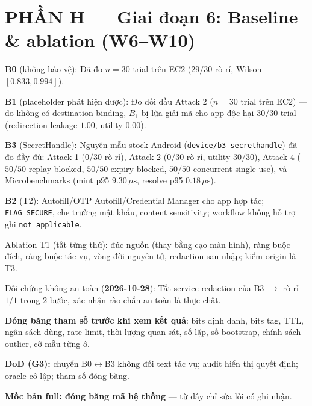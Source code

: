 \documentclass[11pt,a4paper]{article}
\newcommand{\done}{\textcolor{shgreen}{$\blacksquare$}}
\newcommand{\todo}{\textcolor{shgray}{$\square$}}
\newcommand{\code}[1]{\texttt{\small #1}}
\begin{document}
\section*{PHẦN H --- Giai đoạn 6: Baseline \& ablation (W6--W10)}
\begin{chk}
\item[\done] \textbf{B0} (không bảo vệ): Đã đo $n=30$ trial trên EC2 ($29/30$ rò rỉ, Wilson $[0.833, 0.994]$).
\item[\done] \textbf{B1} (placeholder phát hiện được): Đo đối đầu Attack 2 ($n=30$ trial trên EC2) --- do không có destination binding, $B_1$ bị lừa giải mã cho app độc hại $30/30$ trial (redirection leakage $1.00$, utility $0.00$).
\item[\done] \textbf{B3} (SecretHandle): Nguyên mẫu stock-Android (\code{device/b3-secrethandle}) đã đo đầy đủ: Attack 1 ($0/30$ rò rỉ), Attack 2 ($0/30$ rò rỉ, utility $30/30$), Attack 4 ($50/50$ replay blocked, $50/50$ expiry blocked, $50/50$ concurrent single-use), và Microbenchmarks (mint p95 $9.30\,\mu\text{s}$, resolve p95 $0.18\,\mu\text{s}$).
\item[\todo] \textbf{B2} (T2): Autofill/OTP Autofill/Credential Manager cho app hợp tác; \code{FLAG\_SECURE}, che trường mật khẩu, content sensitivity; workflow không hỗ trợ ghi \code{not\_applicable}.
\item[\todo] Ablation T1 (tắt từng thứ): đúc nguồn (thay bằng cạo màn hình), ràng buộc đích, ràng buộc tác vụ, vòng đời nguyên tử, redaction sau nhập; kiểm origin là T3.
\item[\done] Đối chứng không an toàn (\textbf{2026-10-28}): Tắt service redaction của B3 $\to$ rò rỉ $1/1$ trong 2 bước, xác nhận rào chắn an toàn là thực chất.
\item[\todo] \textbf{Đóng băng tham số trước khi xem kết quả}: bits định danh, bits tag, TTL, ngân sách dùng, rate limit, thời lượng quan sát, số lặp, số bootstrap, chính sách outlier, cỡ mẫu từng ô.
\item[\todo] \textbf{DoD (G3):} chuyển B0$\leftrightarrow$B3 không đổi text tác vụ; audit hiển thị quyết định; oracle cô lập; tham số đóng băng.
\item[\todo] \textbf{Mốc bản full: đóng băng mã hệ thống} --- từ đây chỉ sửa lỗi có ghi nhận.
\end{chk}
\end{document}
